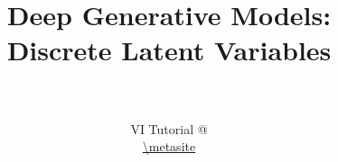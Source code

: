 \documentclass[14pt]{beamer}
\title[Discrete DGMs]{Deep Generative Models: \\
Discrete Latent Variables}
\date{}
\author[VI Tutorial @ \metahost]{ \metaauthor \\ 
~\\
VI Tutorial @ \metahost \\
\url{\metasite}
}
\begin{document}
\frame{\titlepage}

\frame{\tableofcontents}


\end{document}
